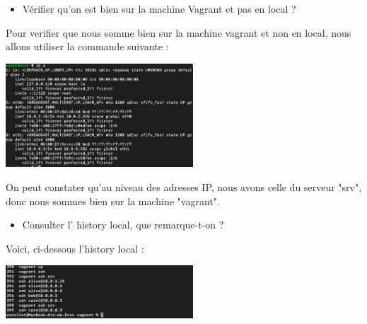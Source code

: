 \documentclass[12pt]{article}
\begin{document}
\vspace{0.3cm}

\newpage

\vspace{0.3cm}

\begin{itemize}
  \item Vérifier qu'on est bien sur la machine Vagrant et pas en local ?
\end{itemize}

\vspace{0.3cm}

Pour verifier que nous somme bien sur la machine vagrant et non en local, nous allons utiliser la commande suivante : 

\vspace{0.3cm}

\begin{center}
  \includegraphics[width=7cm]{Image-TD-SSH-1/Commande-IPA.png}
\end{center}

\vspace{0.3cm}

On peut constater qu'au niveau des adresses IP, nous avons celle du serveur "srv", donc nous sommes bien sur la machine "vagrant".

\vspace{0.3cm}

\begin{itemize}
  \item Consulter l' history local, que remarque-t-on ?
\end{itemize}

\vspace{0.3cm}

Voici, ci-dessous l'history local : 

\vspace{0.3cm}

\begin{center}
  \includegraphics[width=7cm]{Image-TD-SSH-1/History-Local.png}
\end{center}
\end{document}
